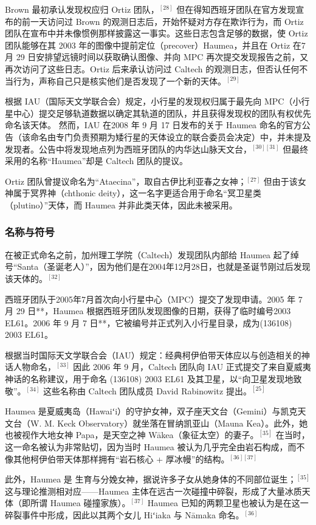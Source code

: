 Brown 最初承认发现权应归 Ortiz 团队，$^{[28]}$ 但在得知西班牙团队在官方发现宣布的前一天访问过 Brown 的观测日志后，开始怀疑对方存在欺诈行为，而 Ortiz 团队在宣布中并未像惯例那样披露这一事实。这些日志包含足够的数据，使 Ortiz 团队能够在其 2003 年的图像中提前定位（precover）Haumea，并且在 Ortiz 在7 月 29 日安排望远镜时间以获取确认图像、并向 MPC 再次提交发现报告之前，又再次访问了这些日志。Ortiz 后来承认访问过 Caltech 的观测日志，但否认任何不当行为，声称自己只是核实他们是否发现了一个新的天体。$^{[29]}$

根据 IAU（国际天文学联合会）规定，小行星的发现权归属于最先向 MPC（小行星中心）提交足够轨道数据以确定其轨道的团队，并且获得发现权的团队有权优先命名该天体。
然而，IAU 在2008 年 9 月 17 日发布的关于 Haumea 命名的官方公告（该命名由专门负责预期为矮行星的天体设立的联合委员会决定）中，并未提及发现者。公告中将发现地点列为西班牙团队的内华达山脉天文台，$^{[30][31]}$ 但最终采用的名称“Haumea”却是 Caltech 团队的提议。

Ortiz 团队曾提议命名为“Ataecina”，取自古伊比利亚春之女神；$^{[27]}$ 但由于该女神属于冥界神（chthonic deity），这一名字更适合用于命名“冥卫星类（plutino）”天体，而 Haumea 并非此类天体，因此未被采用。
\subsubsection{名称与符号}
在被正式命名之前，加州理工学院（Caltech）发现团队内部给 Haumea 起了绰号“Santa（圣诞老人）”，因为他们是在2004年12月28日，也就是圣诞节刚过后发现该天体的。$^{[32]}$

西班牙团队于2005年7月首次向小行星中心（MPC）提交了发现申请。2005 年 7 月 29 日**，Haumea 根据西班牙团队发现图像的日期，获得了临时编号2003 EL61。2006 年 9 月 7 日**，它被编号并正式列入小行星目录，成为(136108) 2003 EL61。

根据当时国际天文学联合会（IAU）规定：经典柯伊伯带天体应以与创造相关的神话人物命名，$^{[33]}$ 因此 2006 年 9 月，Caltech 团队向 IAU 正式提交了来自夏威夷神话的名称建议，用于命名 (136108) 2003 EL61 及其卫星，以“向卫星发现地致敬”。$^{[34]}$ 这些名称由 Caltech 团队成员 David Rabinowitz 提出。$^{[25]}$

Haumea 是夏威夷岛（Hawaiʻi）的守护女神，双子座天文台（Gemini）与凯克天文台（W. M. Keck Observatory）就坐落在冒纳凯亚山（Mauna Kea）。此外，她也被视作大地女神 Papa，是天空之神 Wākea（象征太空）的妻子。$^{[35]}$ 在当时，这一命名被认为非常贴切，因为当时 Haumea 被认为几乎完全由岩石构成，而不像其他柯伊伯带天体那样拥有“岩石核心 + 厚冰幔”的结构。$^{[36][37]}$

此外，Haumea 是 生育与分娩女神，据说许多子女从她身体的不同部位诞生；$^{[35]}$ 这与理论推测相对应——Haumea 主体在远古一次碰撞中碎裂，形成了大量冰质天体（即所谓 Haumea 碰撞家族）。$^{[37]}$ Haumea 已知的两颗卫星也被认为是在这一碎裂事件中形成，因此以其两个女儿 Hiʻiaka 与 Nāmaka 命名。$^{[36]}$

